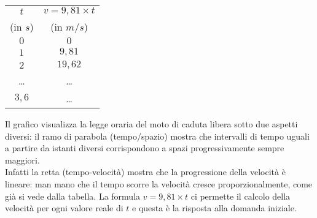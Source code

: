  \begin{minipage}{0.3\textwidth}
 \begin{center}
\begin{tabular}{cc}\toprule
\(t\)        & \(v=9,81\times t\)  \\
(in \(s\))   &   (in \(m/s\)) \\\midrule
\(0\)        & \(0\)  \\
\(1\)        & \(9,81\) \\
\(2\)        & \(19,62\) \\
\dots        & \dots \\
\(3,6\)      & \dots  \\\bottomrule
\end{tabular}
\label{tab:diff_velocita}
\end{center}
 \end{minipage}
  \hfill
 \begin{minipage}{.68 \textwidth}
 \end{minipage}

Il grafico visualizza la legge oraria del 
moto di caduta libera sotto due aspetti diversi: il ramo di parabola 
(tempo/spazio) mostra che intervalli di tempo uguali a partire da istanti 
diversi corrispondono a spazi progressivamente sempre maggiori. \\
Infatti la retta (tempo-velocità) mostra che la progressione della 
velocità è lineare: man mano che il tempo 
scorre la velocità cresce proporzionalmente, come già si vede dalla tabella.
La formula \(v=9,81\times t\) ci permette il calcolo della velocità per 
ogni valore reale di \(t\) e questa è la risposta alla domanda iniziale. 

